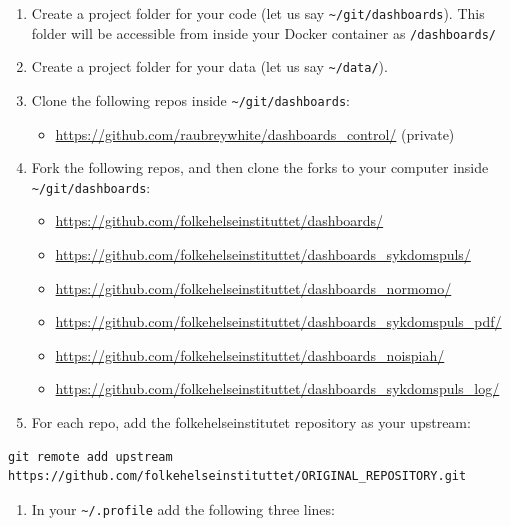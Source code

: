 \documentclass[12pt,]{article}
\providecommand{\tightlist}{%
  \setlength{\itemsep}{0pt}\setlength{\parskip}{0pt}}
\begin{document}
\begin{enumerate}
\def\labelenumi{\arabic{enumi}.}
\tightlist
\item
  Create a project folder for your code (let us say
  \texttt{\textasciitilde{}/git/dashboards}). This folder will be
  accessible from inside your Docker container as \texttt{/dashboards/}
\item
  Create a project folder for your data (let us say
  \texttt{\textasciitilde{}/data/}).
\item
  Clone the following repos inside
  \texttt{\textasciitilde{}/git/dashboards}:

  \begin{itemize}
  \tightlist
  \item
    \url{https://github.com/raubreywhite/dashboards_control/} (private)
  \end{itemize}
\item
  Fork the following repos, and then clone the forks to your computer
  inside \texttt{\textasciitilde{}/git/dashboards}:

  \begin{itemize}
  \tightlist
  \item
    \url{https://github.com/folkehelseinstituttet/dashboards/}
  \item
    \url{https://github.com/folkehelseinstituttet/dashboards_sykdomspuls/}
  \item
    \url{https://github.com/folkehelseinstituttet/dashboards_normomo/}
  \item
    \url{https://github.com/folkehelseinstituttet/dashboards_sykdomspuls_pdf/}
  \item
    \url{https://github.com/folkehelseinstituttet/dashboards_noispiah/}
  \item
    \url{https://github.com/folkehelseinstituttet/dashboards_sykdomspuls_log/}
  \end{itemize}
\item
  For each repo, add the folkehelseinstitutet repository as your
  upstream:
\end{enumerate}

\begin{verbatim}
git remote add upstream https://github.com/folkehelseinstituttet/ORIGINAL_REPOSITORY.git
\end{verbatim}

\begin{enumerate}
\def\labelenumi{\arabic{enumi}.}
\setcounter{enumi}{5}
\tightlist
\item
  In your \texttt{\textasciitilde{}/.profile} add the following three
  lines:
\end{enumerate}
\end{document}
